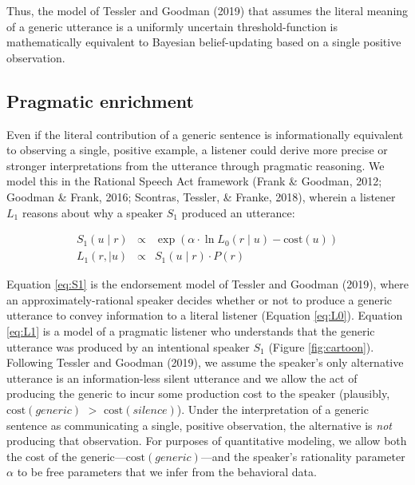 \documentclass[floatsintext,doc]{apa6}
\begin{document}
Thus, the model of Tessler and Goodman (2019) that assumes the literal meaning of a generic utterance is a uniformly uncertain threshold-function is mathematically equivalent to Bayesian belief-updating based on a single positive observation. 

\hypertarget{pragmatic-enrichment}{%
\subsection{Pragmatic enrichment}\label{pragmatic-enrichment}}

Even if the literal contribution of a generic sentence is informationally equivalent to observing a single, positive example, a listener could derive more precise or stronger interpretations from the utterance through pragmatic reasoning.
We model this in the Rational Speech Act framework (Frank \& Goodman, 2012; Goodman \& Frank, 2016; Scontras, Tessler, \& Franke, 2018), wherein a listener \(L_1\) reasons about why a speaker \(S_1\) produced an utterance:

\begin{eqnarray}
S_1(u \mid r) &\propto& \exp{(\alpha \cdot \ln L_0(r \mid u) - \text{cost}(u))} \label{eq:S1} \\
L_1(r, \mid u) &\propto& S_1(u \mid r) \cdot P(r) \label{eq:L1}
\end{eqnarray}

Equation \ref{eq:S1} is the endorsement model of Tessler and Goodman (2019), where an approximately-rational speaker decides whether or not to produce a generic utterance to convey information to a literal listener (Equation \ref{eq:L0}).
Equation \ref{eq:L1} is a model of a pragmatic listener who understands that the generic utterance was produced by an intentional speaker \(S_1\) (Figure \ref{fig:cartoon}).
Following Tessler and Goodman (2019), we assume the speaker's only alternative utterance is an information-less silent utterance and we allow the act of producing the generic to incur some production cost to the speaker (plausibly, \(\text{cost}(generic)\) \(>\) \(\text{cost}(silence)\)).
Under the interpretation of a generic sentence as communicating a single, positive observation, the alternative is \emph{not} producing that observation.
For purposes of quantitative modeling, we allow both the cost of the generic---\(\text{cost}(generic)\)---and the speaker's rationality parameter \(\alpha\) to be free parameters that we infer from the behavioral data.
\end{document}
